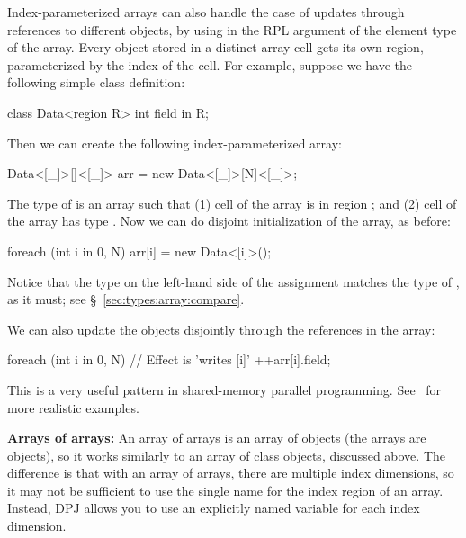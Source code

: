 Index-parameterized arrays can also handle the case of updates through
references to different objects, by using \kwd{[\_]} in the RPL
argument of the element type of the array.  Every object stored in a
distinct array cell gets its own region, parameterized by the index of
the cell.  For example, suppose we have the following simple class
definition:
%
\begin{dpjlisting}
class Data<region R> {
    int field in R;
}
\end{dpjlisting}
%
Then we can create the following index-parameterized array:
%
\begin{dpjlisting}
Data<[_]>[]<[_]> arr = new Data<[_]>[N]<[_]>;
\end{dpjlisting}
%
The type of  is an array such that (1) cell  of the
array is in region \kwd{[i]}; and (2) cell  of the array has
type .  Now we can do disjoint initialization of the
array, as before:
%
\begin{dpjlisting}
foreach (int i in 0, N)
    arr[i] = new Data<[i]>();
\end{dpjlisting}
%
Notice that the type  on the left-hand side of the
assignment matches the type of , as it must; see
\S~\ref{sec:types:array:compare}.

We can also update the objects disjointly through the references in
the array:
%
\begin{dpjlisting}
foreach (int i in 0, N)
    // Effect is 'writes [i]'
    ++arr[i].field;
\end{dpjlisting}
%
This is a very useful pattern in shared-memory parallel programming.
See \tutorial\ for more realistic examples.

\textbf{Arrays of arrays:} An array of arrays is an array of objects
(the arrays are objects), so it works similarly to an array of class
objects, discussed above.  The difference is that with an array of
arrays, there are multiple index dimensions, so it may not be
sufficient to use the single name \kwd{[\_]} for the index region of
an array.  Instead, DPJ allows you to use an explicitly named variable
for each index dimension.

